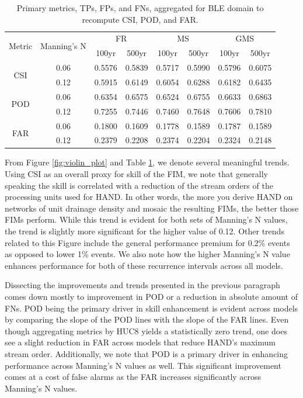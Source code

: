 %
\begin{table}[h!]
\caption{Primary metrics, TPs, FPs, and FNs, aggregated for BLE domain to recompute CSI, POD, and FAR.}
\label{tab:aggregate_metrics}
\centering
\begin{tabular}{|c|c||c|c|c|c|c|c|}
\hline
\multirow{2}{*}{Metric} & \multirow{2}{*}{Manning's N} & \multicolumn{2}{|c|}{FR} & \multicolumn{2}{|c|}{MS} & \multicolumn{2}{|c|}{GMS} \\
\cline{3-8}
  &  & 100yr & 500yr & 100yr & 500yr & 100yr & 500yr \\
\hline
\multirow{2}{*}{CSI} & 0.06 & 0.5576 & 0.5839 & 0.5717 & 0.5990 & 0.5796 & 0.6075 \\
\cline{2-8}
  & 0.12 & 0.5915 & 0.6149 & 0.6054 & 0.6288 & 0.6182 & 0.6435 \\
\hline
\multirow{2}{*}{POD} & 0.06 & 0.6354 & 0.6575 & 0.6524 & 0.6755 & 0.6633 & 0.6863 \\
\cline{2-8}
  & 0.12 & 0.7255 & 0.7446 & 0.7460 & 0.7648 & 0.7606 & 0.7810 \\
\hline
\multirow{2}{*}{FAR} & 0.06 & 0.1800 & 0.1609 & 0.1778 & 0.1589 & 0.1787 & 0.1589 \\
\cline{2-8}
  & 0.12 & 0.2379 & 0.2208 & 0.2374 & 0.2204 & 0.2324 & 0.2148 \\
\hline
\end{tabular}
\end{table}
%
From Figure \ref{fig:violin_plot} and Table \ref{tab:aggregate_metrics}, we denote several meaningful trends. 
Using CSI as an overall proxy for skill of the FIM, we note that generally speaking the skill is correlated with a reduction of the stream orders of the processing units used for HAND.
In other words, the more you derive HAND on networks of unit drainage density and mosaic the resulting FIMs, the better those FIMs perform.
While this trend is evident for both sets of Manning's N values, the trend is slightly more significant for the higher value of 0.12.
Other trends related to this Figure include the general performance premium for 0.2\% events as opposed to lower 1\% events.
We also note how the higher Manning's N value enhances performance for both of these recurrence intervals across all models.

Dissecting the improvements and trends presented in the previous paragraph comes down mostly to improvement in POD or a reduction in absolute amount of FNs.
POD being the primary driver in skill enhancement is evident across models by comparing the slope of the POD lines with the slope of the FAR lines.
Even though aggregating metrics by HUC8 yields a statistically zero trend, one does see a slight reduction in FAR across models that reduce HAND's maximum stream order.
Additionally, we note that POD is a primary driver in enhancing performance across Manning's N values as well.
This significant improvement comes at a cost of false alarms as the FAR increases significantly across Manning's N values.
%
